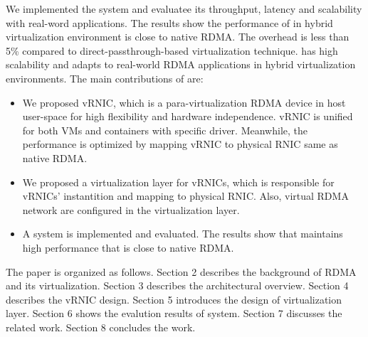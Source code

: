 We implemented the \sys system and evaluatee its throughput, latency and scalability with real-word applications. The results show the performance of \sys  in hybrid virtualization environment is close to native RDMA. The overhead is less than 5\% compared to direct-passthrough-based virtualization technique. \sys has high scalability and adapts to real-world RDMA applications in hybrid virtualization environments. The main contributions of \sys are:

\begin{itemize}
	\item We proposed vRNIC, which is a para-virtualization RDMA device in host user-space for high flexibility and hardware independence. vRNIC is unified for both VMs and containers with specific driver. Meanwhile, the performance is optimized by mapping vRNIC to physical RNIC same as native RDMA.
	
	\item We proposed a virtualization layer for vRNICs, which is responsible for vRNICs' instantition and mapping to physical RNIC. Also, virtual RDMA network are configured in the virtualization layer.
	
	\item A \sys system is implemented and evaluated. The results show that \sys maintains high performance that is close to native RDMA.
\end{itemize}

The paper is organized as follows. Section 2 describes the background of RDMA and its virtualization. Section 3 describes the architectural overview. Section 4 describes the vRNIC design. Section 5 introduces the design of virtualization layer. Section 6 shows the evalution results of \sys system. Section 7 discusses the related work. Section 8 concludes the work.